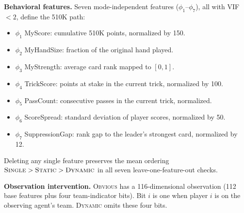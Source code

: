 \documentclass[letterpaper]{article}
\begin{document}
\textbf{Behavioral features.}
Seven mode-independent features ($\phi_1$--$\phi_7$), all with VIF $<2$, define the 510K path:
\begin{itemize}
\item $\phi_1$ MyScore: cumulative 510K points, normalized by 150.
\item $\phi_2$ MyHandSize: fraction of the original hand played.
\item $\phi_3$ MyStrength: average card rank mapped to $[0,1]$.
\item $\phi_4$ TrickScore: points at stake in the current trick, normalized by 100.
\item $\phi_5$ PassCount: consecutive passes in the current trick, normalized.
\item $\phi_6$ ScoreSpread: standard deviation of player scores, normalized by 50.
\item $\phi_7$ SuppressionGap: rank gap to the leader's strongest card, normalized by 12.
\end{itemize}
Deleting any single feature preserves the mean ordering
$\textsc{Single}>\textsc{Static}>\textsc{Dynamic}$ in all seven leave-one-feature-out checks.

\textbf{Observation intervention.}
\textsc{Obvious} has a 116-dimensional observation (112 base features plus four team-indicator bits).
Bit $i$ is one when player $i$ is on the observing agent's team.
\textsc{Dynamic} omits these four bits.
\end{document}
